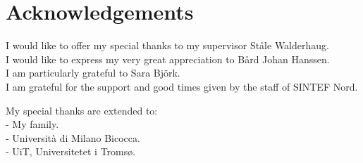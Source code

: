 \clearpage 
\chapter{Acknowledgements}
    I would like to offer my special thanks to my supervisor Ståle Walderhaug.\\
	I would like to express my very great appreciation to Bård Johan Hanssen.\\
    I am particularly grateful to Sara Björk. \\
	I am grateful for the support and good times given by the staff of SINTEF Nord.
 	
 	My special thanks are extended to:\\
 	- My family.\\
 	- Università di Milano Bicocca.\\
 	- UiT, Universitetet i Tromsø.

